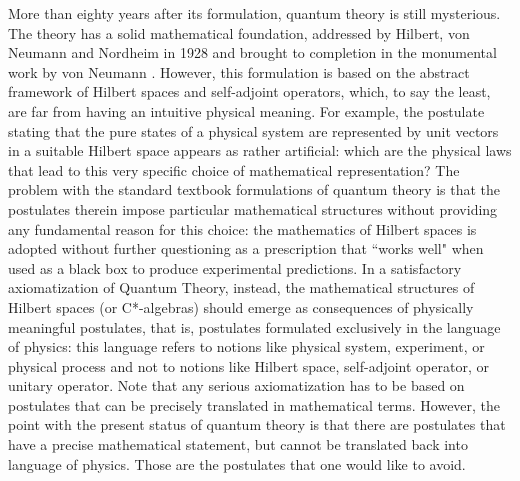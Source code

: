 \documentclass[12pt,aps,pra,showpacs,groupedaddress]{revtex4-1}
\begin{document}
More than eighty years after its formulation, quantum theory is still mysterious.  The theory has a
solid mathematical foundation, addressed by Hilbert, von Neumann and Nordheim in 1928  \cite{HNN28}
and brought to completion in the monumental work by von Neumann \cite{von32}.  However, this
formulation is based on the abstract framework of Hilbert spaces and self-adjoint operators,  which,
to say the least, are far from having an intuitive physical meaning.   For example, the postulate stating that the pure states of a physical system are represented by unit vectors in a suitable Hilbert space appears as rather artificial:  which are the physical laws that lead to this very specific choice of mathematical representation?     
The problem with the standard textbook formulations of quantum theory is that the postulates therein impose particular mathematical structures without providing any fundamental reason for this choice:  the mathematics of Hilbert spaces is adopted without further questioning as a prescription that ``works well"  when used as a black box to produce experimental predictions. 
In a satisfactory axiomatization of Quantum Theory, instead, the mathematical structures of Hilbert spaces (or C*-algebras) should emerge as consequences of physically meaningful postulates, that is, postulates formulated exclusively in the language of physics: this language refers to notions like physical system, experiment, or physical process and not to notions like Hilbert space,  self-adjoint operator, or unitary operator.   Note that any serious axiomatization has to be based on postulates that can be precisely translated in mathematical terms. However, the point with the present status of quantum theory is that there are postulates that have a precise mathematical statement, but cannot  be translated back into language of physics. Those are the postulates that one would like to avoid.    
\end{document}
